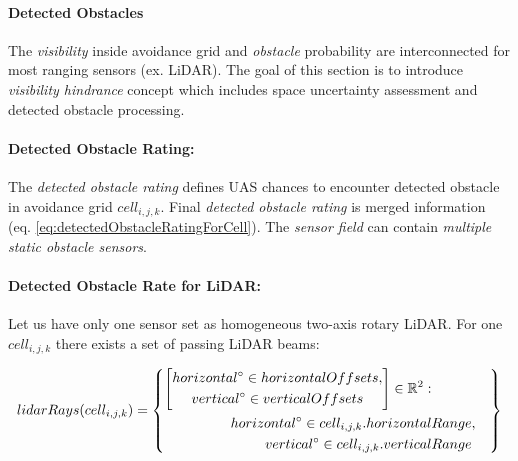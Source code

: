 \paragraph{Detected Obstacles} The \emph{visibility} inside avoidance grid and \emph{obstacle} probability are interconnected for most ranging sensors (ex. LiDAR). The goal of this section is to introduce \emph{visibility hindrance} concept which includes space uncertainty assessment and detected obstacle  processing.

\paragraph{Detected Obstacle Rating:} The \emph{detected obstacle rating} defines UAS chances to encounter detected obstacle in avoidance grid $cell_{i,j,k}$. Final \emph{detected obstacle rating} is merged information (eq. \ref{eq:detectedObstacleRatingForCell}). The \emph{sensor field} can contain \emph{multiple} \emph{static obstacle sensors}.

\paragraph{Detected Obstacle Rate for LiDAR:} Let us have only one sensor set as homogeneous two-axis rotary LiDAR. For one $cell_{i,j,k}$ there exists a set of passing LiDAR beams:

\begin{equation}\label{eq:lidarRaysTroughCell}
    lidar Rays(cell_{i,j,k})=
    \left\{
        \begin{aligned}
        \left[
            \begin{gathered}
                horizontal^\circ\in horizontal Offsets,\\
                vertical^\circ\in vertical Offsets
            \end{gathered}
        \right]\in\mathbb{R}^2:&\\
        horizontal^\circ\in cell_{i,j,k}.horizontal &Range,\\
        vertical^\circ\in cell_{i,j,k}.vertical &Range\\
        \end{aligned}
    \right\}
\end{equation}

